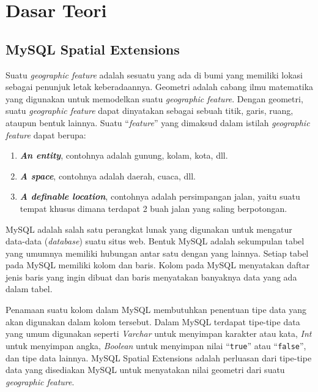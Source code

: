 \chapter{Dasar Teori}
\label{chap:dasar_teori}

\section{MySQL Spatial Extensions}
\label{sec:mysql_spatial_ex}
	Suatu \textit{geographic feature}\cite{mysqlspatial} adalah sesuatu yang ada di bumi yang memiliki lokasi sebagai penunjuk letak keberadaannya. Geometri adalah cabang ilmu matematika yang digunakan untuk memodelkan suatu \textit{geographic feature}. Dengan geometri, suatu \textit{geographic feature} dapat dinyatakan sebagai sebuah titik, garis, ruang, ataupun bentuk lainnya. Suatu ``\textit{feature}'' yang dimaksud dalam istilah \textit{geographic feature} dapat berupa:
	\begin{enumerate}
		\item \textbf{\textit{An entity}}, contohnya adalah gunung, kolam, kota, dll.
		\item \textbf{\textit{A space}}, contohnya adalah daerah, cuaca, dll.
		\item \textbf{\textit{A definable location}}, contohnya adalah persimpangan jalan, yaitu suatu tempat khusus dimana terdapat 2 buah jalan yang saling berpotongan.
	\end{enumerate}
	
	MySQL adalah salah satu perangkat lunak yang digunakan untuk mengatur data-data (\textit{database}) suatu situs web. Bentuk MySQL adalah sekumpulan tabel yang umumnya memiliki hubungan antar satu dengan yang lainnya. Setiap tabel pada MySQL memiliki kolom dan baris. Kolom pada MySQL menyatakan daftar jenis baris yang ingin dibuat dan baris menyatakan banyaknya data yang ada dalam tabel.
	
	Penamaan suatu kolom dalam MySQL membutuhkan penentuan tipe data yang akan digunakan dalam kolom tersebut. Dalam MySQL terdapat tipe-tipe data yang umum digunakan seperti \textit{Varchar} untuk menyimpan karakter atau kata, \textit{Int} untuk menyimpan angka, \textit{Boolean} untuk menyimpan nilai ``\texttt{true}'' atau ``\texttt{false}'', dan tipe data lainnya. MySQL Spatial Extensions adalah perluasan dari tipe-tipe data yang disediakan MySQL untuk menyatakan nilai geometri dari suatu \textit{geographic feature}.
	
